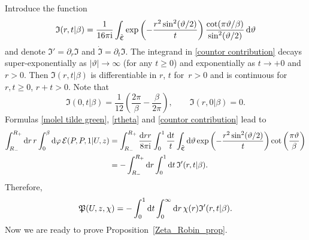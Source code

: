 \documentclass[pdftex]{sigma}
\numberwithin{equation}{section}
\theoremstyle{definition}
\begin{document}
Introduce the function
\begin{gather}\label{countor contribution}
\mathfrak{I}(r,t|\beta)=\frac{1}{16\pi {\rm i} }\int_{\tilde{\mathfrak{C}}}\exp\left(-\frac{r^2\sin^2(\vartheta/2)}{t}\right)\frac{\operatorname{cot}(\pi\vartheta/\beta)}{{\rm sin}^2(\vartheta/2)}\, {\rm d}\vartheta
\end{gather}
and denote $\mathfrak{I}'=\partial_r\mathfrak{I}$ and $\dot{\mathfrak{I}}=\partial_t\mathfrak{I}$. The integrand in \eqref{countor contribution} decays super-exponentially as $|\vartheta|\to \infty$ (for any $t\ge 0$) and exponentially as $t\to +0$ and $r>0$. Then $\mathfrak{I}(r,t|\beta)$ is differentiable in $r$, $t$ for~${r>0}$ and is continuous for $r,t\ge 0$, $r+t>0$. Note that
\[\mathfrak{I}(0,t|\beta)=\frac{1}{12}\left(\frac{2\pi}{\beta}-\frac{\beta}{2\pi}\right), \qquad \mathfrak{I}(r,0|\beta)=0.\]
Formulas \eqref{molel tilde green}, \eqref{rtheta} and \eqref{countor contribution} lead to
\begin{align*}
\int_{R_-}^{R_+}{\rm d}r\, r\int_{0}^{\beta}{\rm d}\varphi\, \mathcal{E}(P,P,1|U,z)&=\int_{R_-}^{R_+}\frac{{\rm d}r r}{8\pi {\rm i} }\int_{0}^{1}\frac{{\rm d}t}{t}\int_{\tilde{\mathfrak{C}}}{\rm d}\vartheta \exp\left(-\frac{r^2 \sin^2(\vartheta/2)}{t}\right)\operatorname{cot}\left(\frac{\pi\vartheta}{\beta}\right)\\
&=-\int_{R_-}^{R_+}{\rm d}r\int_{0}^{1}{\rm d}t\, \mathfrak{I}'(r,t|\beta).
\end{align*}
Therefore,
\begin{gather}
\label{J alpha}
\mathfrak{P}(U,z,\chi)=-\int_{0}^{1}{\rm d}t\int_0^{\infty}{\rm d}r\, \chi(r)\mathfrak{I}'(r,t|\beta).
\end{gather}
Now we are ready to prove Proposition~\ref{Zeta_Robin_prop}.
\end{document}
